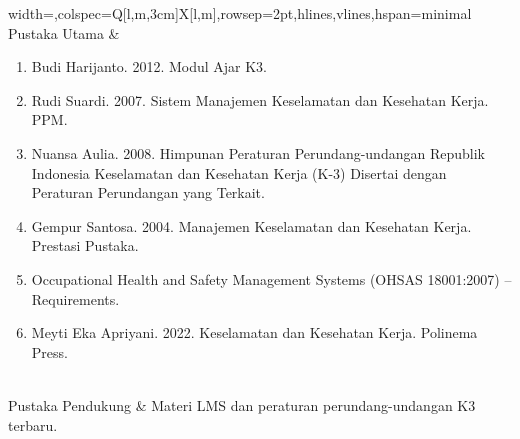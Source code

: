 \begin{longtblr}{width=\textwidth,colspec={Q[l,m,3cm]X[l,m]},rowsep=2pt,hlines,vlines,hspan=minimal}
Pustaka Utama & \begin{enumerate}\item Budi Harijanto. 2012. Modul Ajar K3.\item Rudi Suardi. 2007. Sistem Manajemen Keselamatan dan Kesehatan Kerja. PPM.\item Nuansa Aulia. 2008. Himpunan Peraturan Perundang-undangan Republik Indonesia Keselamatan dan Kesehatan Kerja (K-3) Disertai dengan Peraturan Perundangan yang Terkait.\item Gempur Santosa. 2004. Manajemen Keselamatan dan Kesehatan Kerja. Prestasi Pustaka.\item Occupational Health and Safety Management Systems (OHSAS 18001:2007) -- Requirements.\item Meyti Eka Apriyani. 2022. Keselamatan dan Kesehatan Kerja. Polinema Press.\end{enumerate} \\
Pustaka Pendukung &  Materi LMS dan peraturan perundang-undangan K3 terbaru. \\
\end{longtblr}

